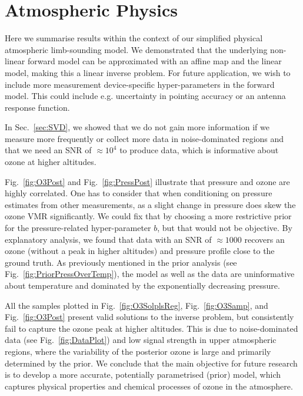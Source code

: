 \section{Atmospheric Physics}
Here we summarise results within the context of our simplified physical atmospheric limb-sounding model.
We demonstrated that the underlying non-linear forward model can be approximated with an affine map and the linear model, making this a linear inverse problem.
For future application, we wish to include more measurement device-specific hyper-parameters in the forward model.
This could include e.g. uncertainty in pointing accuracy or an antenna response function.

In Sec.~\ref{sec:SVD}, we showed that we do not gain more information if we measure more frequently or collect more data in noise-dominated regions and that we need an SNR of $\approx10^4$ to produce data, which is informative about ozone at higher altitudes.

Fig.~\ref{fig:O3Post} and Fig.~\ref{fig:PressPost} illustrate that pressure and ozone are highly correlated.
One has to consider that when conditioning on pressure estimates from other measurements, as a slight change in pressure does skew the ozone VMR significantly.
We could fix that by choosing a more restrictive prior for the pressure-related hyper-parameter $b$, but that would not be objective.
By explanatory analysis, we found that data with an SNR of $\approx 1000$ recovers an ozone (without a peak in higher altitudes) and pressure profile close to the ground truth.
As previously mentioned in the prior analysis (see Fig.~\ref{fig:PriorPressOverTemp}), the model as well as the data are uninformative about temperature and dominated by the exponentially decreasing pressure.

All the samples plotted in Fig.~\ref{fig:O3SolplsReg}, Fig.~\ref{fig:O3Samp}, and Fig.~\ref{fig:O3Post} present valid solutions to the inverse problem, but consistently fail to capture the ozone peak at higher altitudes.
This is due to noise-dominated data (see Fig.~\ref{fig:DataPlot}) and low signal strength in upper atmospheric regions, where the variability of the posterior ozone is large and primarily determined by the prior.
We conclude that the main objective for future research is to develop a more accurate, potentially parametrised (prior) model, which captures physical properties and chemical processes of ozone in the atmosphere.




